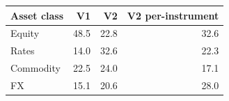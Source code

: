 \begin{tabular}{lrrr}
\toprule
Asset class & V1 & V2 & V2 per-instrument \\
\midrule
Equity & 48.5 & 22.8 & 32.6 \\
Rates & 14.0 & 32.6 & 22.3 \\
Commodity & 22.5 & 24.0 & 17.1 \\
FX & 15.1 & 20.6 & 28.0 \\
\bottomrule
\end{tabular}
